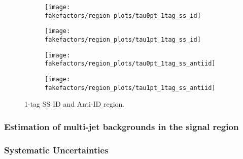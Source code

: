 

\begin{figure}[htbp]
  \centering

  \begin{subfigure}{0.49\textwidth}
    \texttt{[image: fakefactors/region\_plots/tau0pt\_1tag\_ss\_id]}
  \end{subfigure}
  \begin{subfigure}{0.49\textwidth}
    \texttt{[image: fakefactors/region\_plots/tau1pt\_1tag\_ss\_id]}
  \end{subfigure}

  \begin{subfigure}{0.49\textwidth}
    \texttt{[image: fakefactors/region\_plots/tau0pt\_1tag\_ss\_antiid]}
  \end{subfigure}
  \begin{subfigure}{0.49\textwidth}
    \texttt{[image: fakefactors/region\_plots/tau1pt\_1tag\_ss\_antiid]}
  \end{subfigure}

  \caption{1-tag SS ID and Anti-ID region.}
  \label{fig:mjfakes_1tag_ss_plots}
\end{figure}



\subsubsection{Estimation of multi-jet backgrounds in the signal region}


\subsubsection{Systematic Uncertainties}







